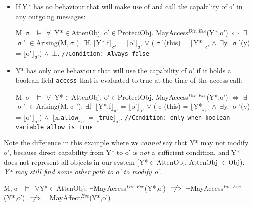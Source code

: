 \documentclass[a4paper,11pt, twoside,twocolumn]{article}
\newenvironment{logic}[1][]
{\begin{flushleft} \small }
{\end{flushleft}}
\newcommand{\loin}{$\in$}
\newcommand{\loforall}{$\forall$}
\newcommand{\loexists}{$\exists$}
\newcommand{\loand}{$\land$}
\newcommand{\loor} {$\lor$}
\newcommand{\lonimplies}{$\centernot\implies$}
\newcommand{\losigma}{$\upsigma$}
\newcommand{\loturns} {$\vDash$}
\newcommand{\loiff} {$\iff$}
\newcommand{\loneg}{$\boldsymbol \neg$}
\newcommand{\loexec}[2] {$\lfloor$#1$\rfloor _{\text{#2}}$}
\newcommand{\ablock} {\null\qquad}
\begin{document}
\begin{itemize}
\item If Y* has no behaviour that will make use of and call the capability of o' in any outgoing messages:
\begin{logic}
M,\losigma\ \loturns\ \loforall\ Y*\loin AttenObj, o'\loin ProtectObj. MayAccess$^{Dir,Eve}$(Y*,o')\linebreak
\ablock \loiff \linebreak
\ablock \loexists \losigma' \loin Arising(M,\losigma).\linebreak
\ablock \loexists f. \loexec{Y*.f}{\losigma'} = \loexec{o'}{\losigma'}
\loor \linebreak
\ablock (\losigma'(this) = \loexec{Y*}{\losigma'} \loand\ \loexists y. \losigma'(y) = \loexec{o'}{\losigma'})\linebreak
\ablock \loand\ $\bot$. \texttt{//Condition: Always false}
\end{logic}
\item Y* has only one behaviour that will use the capability of o' if it holds a boolean field \texttt{access} that is evaluated to true at the time of the access call:
\begin{logic}
M,\losigma\ \loturns\ \loforall\ Y*\loin AttenObj, o'\loin ProtectObj. MayAccess$^{Dir,Eve}$(Y*,o')\linebreak
\ablock \loiff \linebreak
\ablock \loexists \losigma' \loin Arising(M,\losigma').\linebreak
\ablock \loexists f. \loexec{Y*.f}{\losigma'} = \loexec{o'}{\losigma'}
\loor \linebreak
\ablock (\losigma(this) = \loexec{Y*}{\losigma'} \loand\ \loexists y. \losigma'(y) = \loexec{o'}{\losigma'})\linebreak
\ablock \loand\ \loexec{x.\texttt{allow}}{\losigma'} = \loexec{\texttt{true}}{\losigma'}.
\ablock \texttt{//Condition: only when boolean\\ \quad variable allow is true}
\end{logic}
\end{itemize}
Note the difference in this example where we \textit{cannot} say that Y* may not modify o', because direct capability from Y* to o' is \textit{not} a sufficient condition, and Y* does not represent all objects in our system (Y*\loin AttenObj, AttenObj \loin Obj). \textit{Y* may still find some \textit{other} path to o' to modify o'}.
\begin{logic} M,\losigma\ \loturns\ \loforall Y*\loin AttenObj. \loneg MayAccess$^{Dir,Eve}$(Y*,o')\linebreak
\ablock \ablock \lonimplies \linebreak
\ablock \ablock \loneg MayAccess$^{Ind,Eve}$(Y*,o')\linebreak
\ablock \ablock \lonimplies \linebreak
\ablock \ablock \loneg MayAffect$^{Eve}$(Y*,o')\linebreak
\end{logic}
\end{document}
